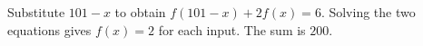 Substitute $101-x$ to obtain $f(101-x)+2f(x)=6$. Solving the two equations gives $f(x)=2$ for each input. The sum is $\boxed{200}$.
